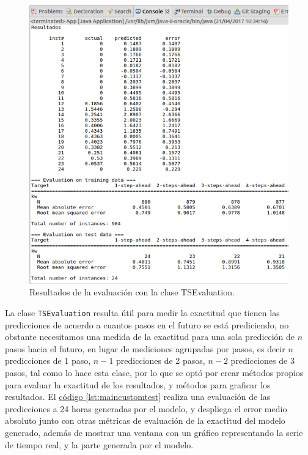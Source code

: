 \begin{figure}[h]
	\centering
	\includegraphics[width=15cm]{img/resultadosEvaluacion.png}
	\caption{Resultados de la evaluación con la clase TSEvaluation. }
	\label{fig:resultadosEvaluacion}
\end{figure}
\clearpage
La clase \texttt{TSEvaluation} resulta útil para medir la exactitud que tienen las predicciones de acuerdo a cuantos pasos en el futuro se está prediciendo, no obstante necesitamos una medida de la exactitud para una sola predicción de $n$ pasos hacia el futuro, en lugar de mediciones agrupadas por pasos, es decir $n$ predicciones de 1 paso, $n-1$ predicciones de 2 pasos, $n-2$ predicciones de 3 pasos, tal como lo hace esta clase, por lo que se optó por crear métodos propios para evaluar la exactitud de los resultados, y métodos para graficar los resultados.
El \hyperref[lst:maincustomtest]{código \ref{lst:maincustomtest}} realiza una evaluación de las predicciones a 24 horas generadas por el modelo, y despliega el error medio absoluto junto con otras métricas de evaluación de la exactitud del modelo generado, además de mostrar una ventana con un gráfico representando la serie de tiempo real, y la parte generada por el modelo.


